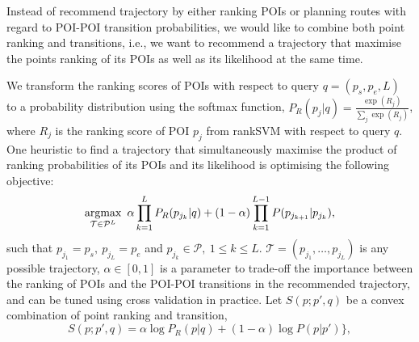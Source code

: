 
Instead of recommend trajectory by either ranking POIs or planning routes with regard to POI-POI transition probabilities, 
we would like to combine both point ranking and transitions,
i.e., we want to recommend a trajectory that maximise the points ranking of its POIs as well as its likelihood at the same time.

We transform the ranking scores of POIs with respect to query $q = (p_s, p_e, L)$
to a probability distribution using the softmax function,
$P_R(p_j | q) = \frac{\exp(R_j)}{\sum_j \exp(R_j)}$,
where $R_j$ is the ranking score of POI $p_j$ from rankSVM with respect to query $q$.
%
One heuristic to find a trajectory that simultaneously maximise the product of ranking probabilities
of its POIs and its likelihood is optimising the following objective:
\begin{equation*}
    \operatorname*{argmax}_{\mathcal{T} \in \mathcal{P}^L} ~\alpha \prod_{k=1}^{L} P_R(p_{j_k} | q) +
                                     (1-\alpha) \prod_{k=1}^{L-1} P(p_{j_{k+1}} | p_{j_k}),
\end{equation*}
such that
$p_{j_1} = p_s, ~ p_{j_L} = p_e$ and
$p_{j_k} \in \mathcal{P}, ~1 \le k \le L$.
$\mathcal{T} = (p_{j_1}, \dots, p_{j_L})$ is any possible trajectory,
$\alpha \in [0, 1]$ is a parameter to trade-off the importance between the ranking of POIs 
and the POI-POI transitions in the recommended trajectory, and can be tuned using cross validation in practice.
Let $S(p; p', q)$ be a convex combination of point ranking and transition,
\begin{equation*}
    S(p; p', q)  = \alpha \log P_R(p|q) + (1-\alpha) \log P(p|p') \},
\end{equation*}
